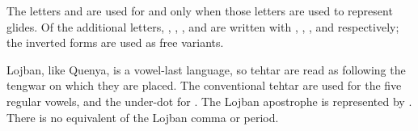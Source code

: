 The letters  and  are used for  and  only when those letters are used to represent glides. Of the additional letters, , , , and  are written with , , , and  respectively; the inverted forms are used as free variants.

Lojban, like Quenya, is a vowel-last language, so tehtar are read as following the tengwar on which they are placed. The conventional tehtar are used for the five regular vowels, and the under-dot for . The Lojban apostrophe is represented by . There is no equivalent of the Lojban comma or period.
